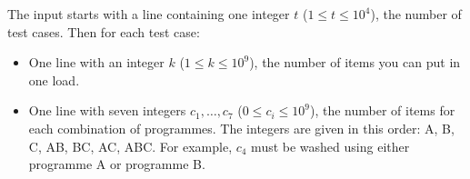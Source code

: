 
    The input starts with a line containing one integer $t$ ($1 \leq t \leq 10^4$), the number of test cases.
    Then for each test case: 
    \begin{itemize}
        \item One line with an integer $k$ ($1\leq k\leq 10^9$), the number of items you can put in one load.
        \item One line with seven integers $c_1, \ldots, c_7$ ($0 \leq c_i \leq 10^9$), the number of items for each combination of programmes. 
        The integers are given in this order: A, B, C, AB, BC, AC, ABC. 
        For example, $c_4$ must be washed using either programme A or programme B.  
    \end{itemize}
